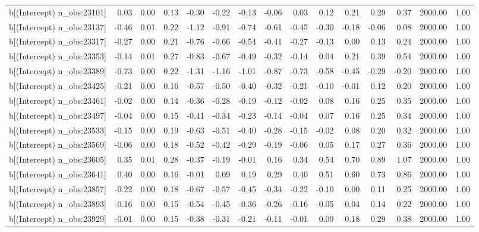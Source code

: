 \begin{table}[ht]
\begin{tabular}{rrrrrrrrrrrrrrr}
  b[(Intercept) n\_obs:23101] & 0.03 & 0.00 & 0.13 & -0.30 & -0.22 & -0.13 & -0.06 & 0.03 & 0.12 & 0.21 & 0.29 & 0.37 & 2000.00 & 1.00 \\ 
  b[(Intercept) n\_obs:23137] & -0.46 & 0.01 & 0.22 & -1.12 & -0.91 & -0.74 & -0.61 & -0.45 & -0.30 & -0.18 & -0.06 & 0.08 & 2000.00 & 1.00 \\ 
  b[(Intercept) n\_obs:23317] & -0.27 & 0.00 & 0.21 & -0.76 & -0.66 & -0.54 & -0.41 & -0.27 & -0.13 & 0.00 & 0.13 & 0.24 & 2000.00 & 1.00 \\ 
  b[(Intercept) n\_obs:23353] & -0.14 & 0.01 & 0.27 & -0.83 & -0.67 & -0.49 & -0.32 & -0.14 & 0.04 & 0.21 & 0.39 & 0.54 & 2000.00 & 1.00 \\ 
  b[(Intercept) n\_obs:23389] & -0.73 & 0.00 & 0.22 & -1.31 & -1.16 & -1.01 & -0.87 & -0.73 & -0.58 & -0.45 & -0.29 & -0.20 & 2000.00 & 1.00 \\ 
  b[(Intercept) n\_obs:23425] & -0.21 & 0.00 & 0.16 & -0.57 & -0.50 & -0.40 & -0.32 & -0.21 & -0.10 & -0.01 & 0.12 & 0.20 & 2000.00 & 1.00 \\ 
  b[(Intercept) n\_obs:23461] & -0.02 & 0.00 & 0.14 & -0.36 & -0.28 & -0.19 & -0.12 & -0.02 & 0.08 & 0.16 & 0.25 & 0.35 & 2000.00 & 1.00 \\ 
  b[(Intercept) n\_obs:23497] & -0.04 & 0.00 & 0.15 & -0.41 & -0.34 & -0.23 & -0.14 & -0.04 & 0.07 & 0.16 & 0.25 & 0.34 & 2000.00 & 1.00 \\ 
  b[(Intercept) n\_obs:23533] & -0.15 & 0.00 & 0.19 & -0.63 & -0.51 & -0.40 & -0.28 & -0.15 & -0.02 & 0.08 & 0.20 & 0.32 & 2000.00 & 1.00 \\ 
  b[(Intercept) n\_obs:23569] & -0.06 & 0.00 & 0.18 & -0.52 & -0.42 & -0.29 & -0.19 & -0.06 & 0.05 & 0.17 & 0.27 & 0.36 & 2000.00 & 1.00 \\ 
  b[(Intercept) n\_obs:23605] & 0.35 & 0.01 & 0.28 & -0.37 & -0.19 & -0.01 & 0.16 & 0.34 & 0.54 & 0.70 & 0.89 & 1.07 & 2000.00 & 1.00 \\ 
  b[(Intercept) n\_obs:23641] & 0.40 & 0.00 & 0.16 & -0.01 & 0.09 & 0.19 & 0.29 & 0.40 & 0.51 & 0.60 & 0.73 & 0.86 & 2000.00 & 1.00 \\ 
  b[(Intercept) n\_obs:23857] & -0.22 & 0.00 & 0.18 & -0.67 & -0.57 & -0.45 & -0.34 & -0.22 & -0.10 & 0.00 & 0.11 & 0.25 & 2000.00 & 1.00 \\ 
  b[(Intercept) n\_obs:23893] & -0.16 & 0.00 & 0.15 & -0.54 & -0.45 & -0.36 & -0.26 & -0.16 & -0.05 & 0.04 & 0.14 & 0.22 & 2000.00 & 1.00 \\ 
  b[(Intercept) n\_obs:23929] & -0.01 & 0.00 & 0.15 & -0.38 & -0.31 & -0.21 & -0.11 & -0.01 & 0.09 & 0.18 & 0.29 & 0.38 & 2000.00 & 1.00 \\ 

\end{tabular}
\end{table}
